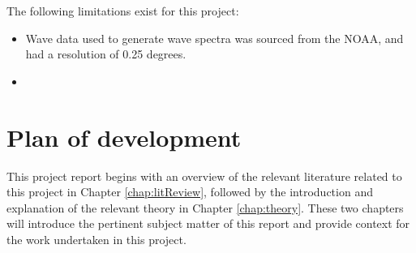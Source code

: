 The following limitations exist for this project:
\begin{itemize}
    \item Wave data used to generate wave spectra was sourced from the NOAA, and had a resolution of 0.25 degrees.
    \item 
\end{itemize}



\section{Plan of development}
\label{sec:intro.planofdevelopment}
This project report begins with an overview of the relevant literature related to this project in Chapter \ref{chap:litReview}, followed by the introduction and explanation of the relevant theory in Chapter \ref{chap:theory}. These two chapters will introduce the pertinent subject matter of this report and provide context for the work undertaken in this project.

